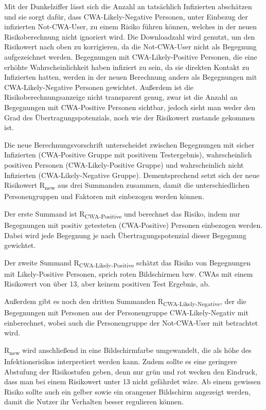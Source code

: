 \documentclass[conference,compsoc]{IEEEtran}
\begin{document}
Mit der Dunkelziffer lässt sich die Anzahl an tatsächlich Infizierten abschätzen und sie sorgt dafür, dass CWA-Likely-Negative Personen, 
unter Einbezug der infizierten Not-CWA-User, zu einem Risiko führen können, welches in der neuen Risikoberechnung nicht ignoriert wird.
Die Downloadzahl wird genutzt, um den Risikowert nach oben zu korrigieren, da die Not-CWA-User nicht als Begegnung aufgezeichnet werden.
Begegnungen mit CWA-Likely-Positive Personen, die eine erhöhte Wahrscheinlichkeit haben infiziert zu sein, da sie direkten Kontakt zu Infizierten hatten, 
werden in der neuen Berechnung anders als Begegnungen mit CWA-Likely-Negative Personen gewichtet.
Außerdem ist die Risikoberechnungsanzeige nicht transparent genug, zwar ist die Anzahl an Begegnungen mit CWA-Positive Personen sichtbar, 
jedoch sieht man weder den Grad des Übertragungspotenzials, noch wie der Risikowert zustande gekommen ist.

Die neue Berechnungsvorschrift unterscheidet zwischen Begegnungen mit sicher Infizierten (CWA-Positive Gruppe mit positivem Testergebnis),
wahrscheinlich positiven Personen (CWA-Likely-Positive Gruppe) und wahrscheinlich nicht Infizierten (CWA-Likely-Negative Gruppe). 
Dementsprechend setzt sich der neue Risikowert R\textsubscript{new} aus drei Summanden zusammen,
damit die unterschiedlichen Personengruppen und Faktoren mit einbezogen werden können.

\centerline{\text{ }}
\centerline{}
\centerline{}
\centerline{\text{ }}

Der erste Summand ist R\textsubscript{CWA-Positive} und berechnet das Risiko, indem nur Begegnungen mit positiv getesteten (CWA-Positive) Personen einbezogen werden. 
Dabei wird jede Begegnung je nach Übertragungspotenzial dieser Begegnung gewichtet. 

Der zweite Summand R\textsubscript{CWA-Likely-Positive} schätzt das Risiko von Begegnungen mit Likely-Positive Personen, sprich roten Bildschirmen bzw. 
CWAs mit einem Risikowert von über 13, aber keinem positiven Test Ergebnis, ab.

Außerdem gibt es noch den dritten Summanden R\textsubscript{CWA-Likely-Negative}, der die Begegnungen mit Personen aus der Personengruppe CWA-Likely-Negativ mit einberechnet,
wobei auch die Personengruppe der Not-CWA-User mit betrachtet wird.

R\textsubscript{new} wird anschließend in eine Bildschirmfarbe umgewandelt, die als höhe des Infektionsrisikos interpretiert werden kann.
Zudem sollte es eine geringere Abstufung der Risikostufen geben, denn nur grün und rot wecken den Eindruck, dass man bei einem Risikowert unter 13 nicht gefährdet wäre. 
Ab einem gewissen Risiko sollte auch ein gelber sowie ein orangener Bildschirm angezeigt werden, damit die Nutzer ihr Verhalten besser regulieren können.
\end{document}
